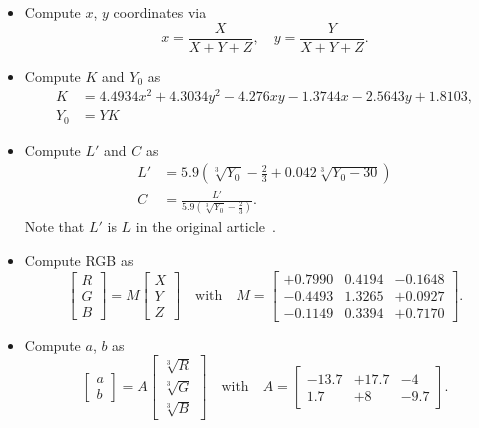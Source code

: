 \documentclass{scrartcl}
\theoremstyle{named}
\begin{document}
\begin{itemize}
  \item Compute $x$, $y$ coordinates via
    \[
      x = \frac{X}{X + Y + Z},\quad y = \frac{Y}{X + Y + Z}.
    \]
  \item Compute $K$ and $Y_0$ as
    \begin{equation}\label{eq:KY0}
      \begin{split}
        K &= 4.4934 x^2 + 4.3034 y^2 - 4.276 x y - 1.3744 x - 2.5643 y + 1.8103,\\
        Y_0 &= Y K
      \end{split}
    \end{equation}

  \item Compute $L'$ and $C$ as
    \begin{align}
        \label{eq:lc}
        L' &= 5.9 \left(\sqrt[3]{Y_0} - \frac{2}{3} + 0.042 \sqrt[3]{Y_0 - 30}\right)\\
        \nonumber
        C &= \frac{L'}{5.9 \left(\sqrt[3]{Y_0} - \frac{2}{3}\right)}.
    \end{align}
    Note that $L'$ is $L$ in the original article~\cite{macadam}.

  \item Compute RGB as
    \begin{equation}\label{eq:m}
      \begin{bmatrix}
        R\\
        G\\
        B
      \end{bmatrix}
      =
      M
      \begin{bmatrix}
        X\\
        Y\\
        Z
      \end{bmatrix}
      \quad\text{with}\quad
      M=\begin{bmatrix}
        +0.7990 & 0.4194 & -0.1648\\
        -0.4493 & 1.3265 & +0.0927\\
        -0.1149 & 0.3394 & +0.7170
      \end{bmatrix}.
    \end{equation}

  \item Compute $a$, $b$ as
    \begin{equation}\label{eq:ab}
      \begin{bmatrix}
        a\\
        b
      \end{bmatrix}
      =
      A
      \begin{bmatrix}
        \sqrt[3]{R}\\
        \sqrt[3]{G}\\
        \sqrt[3]{B}
      \end{bmatrix}
      \quad\text{with}\quad
      A = \begin{bmatrix}
        -13.7 & +17.7 & -4\\
        1.7 & +8 & -9.7
      \end{bmatrix}.
    \end{equation}


\end{itemize}
\end{document}
